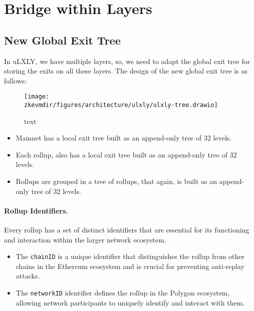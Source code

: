 \section{Bridge within Layers}




\subsection{New Global Exit Tree}

In uLXLY, we have multiple layers, so, we need to adapt the global exit tree for storing the exits on all these layers. The design of the new global exit tree is as follows:

\begin{figure}[h]
\centering
\texttt{[image: \\zkevmdir/figures/architecture/ulxly/ulxly-tree.drawio]}
\caption{text}
\label{fig:ulxly-tree}
\end{figure}

\begin{itemize}
\item Mainnet has a local exit tree built as an append-only tree of 32 levels.
\item Each rollup, also has a local exit tree built as an append-only tree of 32 levels.
\item Rollups are grouped in a tree of rollups, that again, is built as an append-only tree of 32 levels.
\end{itemize}






\paragraph*{Rollup Identifiers.} Every rollup has a set of distinct identifiers that are essential for its functioning and interaction within the larger network ecosystem.

\begin{itemize}

\item The \texttt{chainID} is a unique identifier that distinguishes the rollup from other chains in the Ethereum ecosystem and is crucial for preventing anti-replay attacks.

\item The \texttt{networkID} identifier defines the rollup in the Polygon ecosystem, allowing network participants to uniquely identify and interact with them.

\end{itemize}

